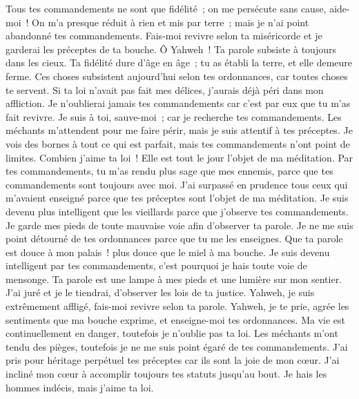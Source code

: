 \begin{multicols}{2}
Tous tes commandements ne sont que fidélité~; on me persécute sans cause, aide-moi~!
On m'a presque réduit à rien et mis par terre~; mais je n'ai point abandonné tes commandements.
Fais-moi revivre selon ta miséricorde et je garderai les préceptes de ta bouche.
 Ô Yahweh~! Ta parole subsiste à toujours dans les cieux.
Ta fidélité dure d'âge en âge~; tu as établi la terre, et elle demeure ferme.
Ces choses subsistent aujourd'hui selon tes ordonnances, car toutes choses te servent.
Si ta loi n'avait pas fait mes délices, j'aurais déjà péri dans mon affliction.
Je n'oublierai jamais tes commandements car c'est par eux que tu m'as fait revivre.
Je suis à toi, sauve-moi~; car je recherche tes commandements.
Les méchants m'attendent pour me faire périr, mais je suis attentif à tes préceptes.
Je vois des bornes à tout ce qui est parfait, mais tes commandements n'ont point de limites.
 Combien j'aime ta loi~! Elle est tout le jour l'objet de ma méditation.
Par tes commandements, tu m'as rendu plus sage que mes ennemis, parce que tes commandements sont toujours avec moi.
J'ai surpassé en prudence tous ceux qui m'avaient enseigné parce que tes préceptes sont l'objet de ma méditation.
Je suis devenu plus intelligent que les vieillards parce que j'observe tes commandements.
Je garde mes pieds de toute mauvaise voie afin d'observer ta parole.
Je ne me suis point détourné de tes ordonnances parce que tu me les enseignes.
Que ta parole est douce à mon palais~! plus douce que le miel à ma bouche.
Je suis devenu intelligent par tes commandements, c'est pourquoi je hais toute voie de mensonge.
 Ta parole est une lampe à mes pieds et une lumière sur mon sentier.
J'ai juré et je le tiendrai, d'observer les lois de ta justice.
Yahweh, je suis extrêmement affligé, fais-moi revivre selon ta parole.
Yahweh, je te prie, agrée les sentiments que ma bouche exprime, et enseigne-moi tes ordonnances.
Ma vie est continuellement en danger, toutefois je n'oublie pas ta loi.
Les méchants m'ont tendu des pièges, toutefois je ne me suis point égaré de tes commandements.
J'ai pris pour héritage perpétuel tes préceptes car ils sont la joie de mon cœur.
J'ai incliné mon cœur à accomplir toujours tes statuts jusqu'au bout.
 Je hais les hommes indécis, mais j'aime ta loi.

\end{multicols}
